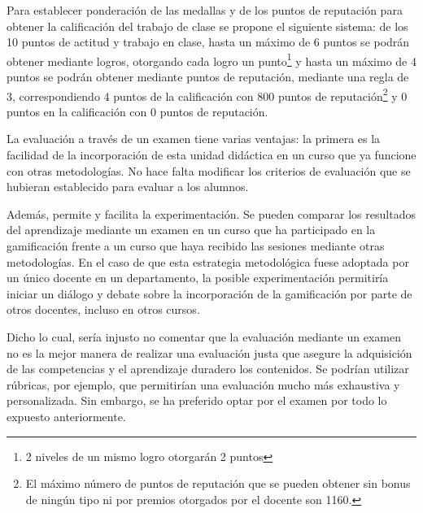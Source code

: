 Para establecer ponderación de las medallas y de los puntos de reputación para obtener la calificación del trabajo de clase se propone el siguiente sistema:
%
de los 10 puntos de actitud y trabajo en clase, hasta un máximo de 6 puntos se podrán obtener mediante logros, otorgando cada logro un punto\footnote{2 niveles de un mismo logro otorgarán 2 puntos} y hasta un máximo de 4 puntos se podrán obtener mediante puntos de reputación, mediante una regla de 3, correspondiendo 4 puntos de la calificación con 800 puntos de reputación\footnote{El máximo número de puntos de reputación que se pueden obtener sin bonus de ningún tipo ni por premios otorgados por el docente son 1160.} y 0 puntos en la calificación con 0 puntos de reputación.


La evaluación a través de un examen tiene varias ventajas:
%
la primera es la facilidad de la incorporación de esta unidad didáctica en un curso que ya funcione con otras metodologías.
%
No hace falta modificar los criterios de evaluación que se hubieran establecido para evaluar a los alumnos.

Además, permite y facilita la experimentación.
%
Se pueden comparar los resultados del aprendizaje mediante un examen en un curso que ha participado en la gamificación frente a un curso que haya recibido las sesiones mediante otras metodologías.
%
En el caso de que esta estrategia metodológica fuese adoptada por un único docente en un departamento, la posible experimentación permitiría iniciar un diálogo y debate sobre la incorporación de la gamificación por parte de otros docentes, incluso en otros cursos.

Dicho lo cual, sería injusto no comentar que la evaluación mediante un examen no es la mejor manera de realizar una evaluación justa que asegure la adquisición de las competencias y el aprendizaje duradero los contenidos.
%
Se podrían utilizar rúbricas, por ejemplo, que permitirían una evaluación mucho más exhaustiva y personalizada.
%
Sin embargo, se ha preferido optar por el examen por todo lo expuesto anteriormente.






